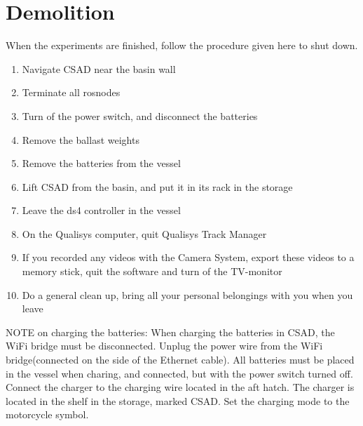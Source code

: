 \chapter{Demolition}
When the experiments are finished, follow the procedure given here to shut down. 
\begin{enumerate}
	\item Navigate CSAD near the basin wall
	\item Terminate all rosnodes
	\item Turn of the power switch, and disconnect the batteries
	\item Remove the ballast weights
	\item Remove the batteries from the vessel
	\item Lift CSAD from the basin, and put it in its rack in the storage
	\item Leave the ds4 controller in the vessel
	\item On the Qualisys computer, quit Qualisys Track Manager
	\item If you recorded any videos with the Camera System, export these videos to a memory stick, quit the software and turn of the TV-monitor
	\item Do a general clean up, bring all your personal belongings with you when you leave
\end{enumerate}
NOTE on charging the batteries: When charging the batteries in CSAD, the WiFi bridge must be disconnected. Unplug the power wire from the WiFi bridge(connected on the side of the Ethernet cable). All batteries must be placed in the vessel when charing, and connected, but with the power switch turned off. Connect the charger to the charging wire located in the aft hatch. The charger is located in the shelf in the storage, marked CSAD. Set the charging mode to the motorcycle symbol. 